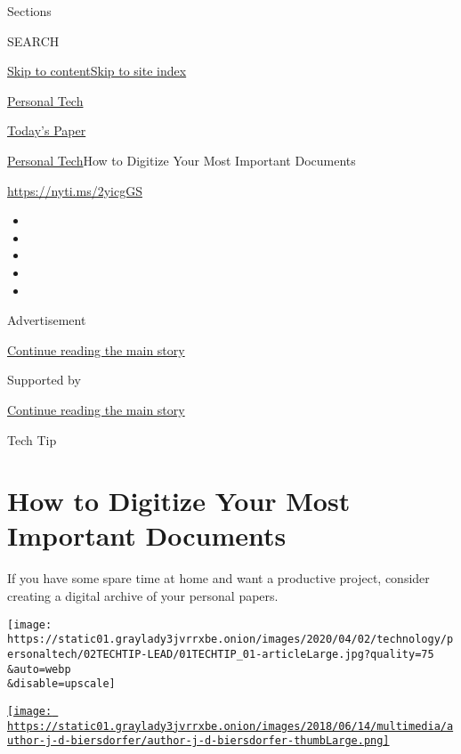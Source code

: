Sections

SEARCH

\protect\hyperlink{site-content}{Skip to
content}\protect\hyperlink{site-index}{Skip to site index}

\href{https://www.nytimes3xbfgragh.onion/section/technology/personaltech}{Personal
Tech}

\href{https://myaccount.nytimes3xbfgragh.onion/auth/login?response_type=cookie\&client_id=vi}{}

\href{https://www.nytimes3xbfgragh.onion/section/todayspaper}{Today's
Paper}

\href{/section/technology/personaltech}{Personal Tech}\textbar{}How to
Digitize Your Most Important Documents

\href{https://nyti.ms/2yicgGS}{https://nyti.ms/2yicgGS}

\begin{itemize}
\item
\item
\item
\item
\item
\end{itemize}

Advertisement

\protect\hyperlink{after-top}{Continue reading the main story}

Supported by

\protect\hyperlink{after-sponsor}{Continue reading the main story}

Tech Tip

\hypertarget{how-to-digitize-your-most-important-documents}{%
\section{How to Digitize Your Most Important
Documents}\label{how-to-digitize-your-most-important-documents}}

If you have some spare time at home and want a productive project,
consider creating a digital archive of your personal papers.

\texttt{[image: https://static01.graylady3jvrrxbe.onion/images/2020/04/02/technology/personaltech/02TECHTIP-LEAD/01TECHTIP\_01-articleLarge.jpg?quality=75\\\&auto=webp\\\&disable=upscale]}

\href{https://www.nytimes3xbfgragh.onion/by/j-d-biersdorfer}{\texttt{[image: https://static01.graylady3jvrrxbe.onion/images/2018/06/14/multimedia/author-j-d-biersdorfer/author-j-d-biersdorfer-thumbLarge.png]}}

